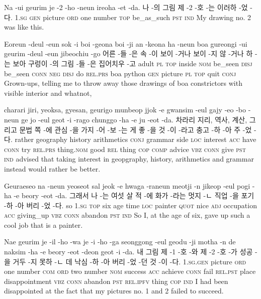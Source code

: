 \begin{example}
\tgl
		{Na -ui geurim je -2 -ho -neun ireoha -et -da.}
		{나 -의 그림 제 -2 -호 -는 이러하 -었 -다.}
		{\textsc{1.sg} \textsc{gen} picture \textsc{ord} one number \textsc{top} be\_as\_such \textsc{pst} \textsc{ind}}
		{My drawing no. 2 was like this.}
\end{example}

\begin{example}
\tgl
		{Eoreun -deul -eun sok -i boi -geona boi -ji an -keona ha -neun boa gureongi -ui geurim -deul -eun jibeochiu -go}
		{어른 -들 -은 속 -이 보이 -거나 보이 -지 않 -거나 하 -는 보아 구렁이 -의 그림 -들 -은 집어치우 -고}
		{adult	\textsc{pl}	\textsc{top}	inside	\textsc{nom}	be\_seen	\textsc{disj}	be\_seen	\textsc{conn}	\textsc{neg}	\textsc{disj}	do	\textsc{rel.prs}	boa	python	\textsc{gen}	picture	\textsc{pl}	\textsc{top}	quit	\textsc{conj}}
		{Grown-ups, telling me to throw away those drawings of boa constrictors with visible interior and whatnot,}

\tgl
		{charari jiri, yeoksa, gyesan, geurigo munbeop jjok -e gwansim -eul gajy -eo -bo -neun ge jo -eul geot -i -rago chunggo -ha -e ju -eot -da.}
		{차라리 지리, 역사, 계산, 그리고 문법 쪽 -에 관심 -을 가지 -어 -보 -는 게 좋 -을 것 -이 -라고 충고 -하 -아 주 -었 -다.}
		{rather	geography	history	arithmetics	\textsc{conj}	grammar	side	\textsc{loc}	interest	\textsc{acc}	have	\textsc{conn}	try	\textsc{rel.prs}	thing.\textsc{nom}	good	\textsc{rel}	thing	\textsc{cop}	\textsc{comp}	advice	\textsc{vbz}	\textsc{conn}	give	\textsc{pst}	\textsc{ind}}
		{advised that taking interest in geopgraphy, history, arithmetics and grammar instead would rather be better.}
\end{example}

\begin{example}
\tgl
		{Geuraeseo na -neun yeoseot sal jeok -e hwaga -raneun meotji -n jikeop -eul pogi -ha -e beory -eot -da.}
		{그래서 나 -는 여섯 살 적 -에 화가 -라는 멋지 -ㄴ 직업 -을 포기 -하 -아 버리 -었 -다.}
		{so	\textsc{1.sg}	\textsc{top}	six	age	time	\textsc{loc} 	painter	\textsc{quot}	nice	\textsc{adj}	occupation	\textsc{acc}	giving\_up	\textsc{vbz}	\textsc{conn}	abandon	\textsc{pst}	\textsc{ind}}
		{So I, at the age of six, gave up such a cool job that is a painter.}
\end{example}

\begin{example}
\tgl
		{Nae geurim je -il -ho -wa je -i -ho -ga seonggong -eul geodu -ji motha -n de naksim -ha -e beory -eot -deon geot -i -da.}
		{내 그림 제 -1 -호 -와 제 -2 -호 -가 성공 -을 거두 -지 못하 -ㄴ 데 낙심 -하 -아 버리 -었 -던 것 -이 -다.}
		{\textsc{1.sg.gen}	picture	\textsc{ord}	one	number	\textsc{com} \textsc{ord}	two	number	\textsc{nom}	success	\textsc{acc}	achieve	\textsc{conn}	fail	\textsc{rel.pst}	place	disappointment	\textsc{vbz}	\textsc{conn}	abandon	\textsc{pst}	\textsc{rel.ipfv}	thing	\textsc{cop}	\textsc{ind}}
		{I had been disappointed at the fact that my pictures no. 1 and 2 failed to succeed.}
\end{example}

